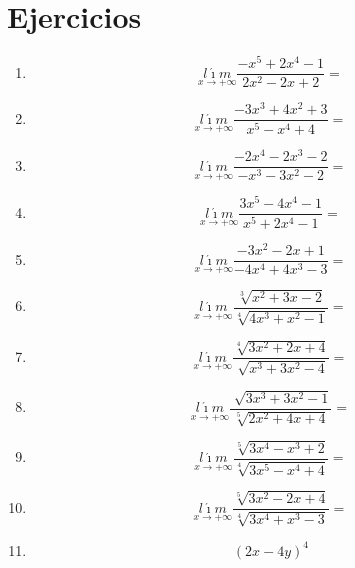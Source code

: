 \documentclass[oneside,spanish,letter]{article}
\begin{document}
\section{Ejercicios}
\begin{enumerate}
 \item $$\underset{x\rightarrow +\infty}{l\acute{\imath}m} \frac{-x^5+2x^4-1}{2x^2-2x+2}=$$
 \item $$\underset{x\rightarrow +\infty}{l\acute{\imath}m} \frac{-3x^3+4x^2+3}{x^5-x^4+4}=$$
 \item $$\underset{x\rightarrow +\infty}{l\acute{\imath}m} \frac{-2x^4-2x^3-2}{-x^3-3x^2-2}=$$
 \item $$\underset{x\rightarrow +\infty}{l\acute{\imath}m} \frac{3x^5-4x^4-1}{x^5+2x^4-1}=$$
 \item $$\underset{x\rightarrow +\infty}{l\acute{\imath}m} \frac{-3x^2-2x+1}{-4x^4+4x^3-3}=$$
 \item $$\underset{x\rightarrow +\infty}{l\acute{\imath}m} \frac{\sqrt[3]{x^2+3x-2}}{\sqrt[4]{4x^3+x^2-1}}=$$
 \item $$\underset{x\rightarrow +\infty}{l\acute{\imath}m} \frac{\sqrt[4]{3x^2+2x+4}}{\sqrt[]{x^3+3x^2-4}}=$$
 \item $$\underset{x\rightarrow +\infty}{l\acute{\imath}m} \frac{\sqrt[]{3x^3+3x^2-1}}{\sqrt[5]{2x^2+4x+4}}=$$
 \item $$\underset{x\rightarrow +\infty}{l\acute{\imath}m} \frac{\sqrt[5]{3x^4-x^3+2}}{\sqrt[4]{3x^5-x^4+4}}=$$
 \item $$\underset{x\rightarrow +\infty}{l\acute{\imath}m} \frac{\sqrt[5]{3x^2-2x+4}}{\sqrt[4]{3x^4+x^3-3}}=$$
\item $$(2x-4y)^4$$
 \end{enumerate}
  \newpage
\end{document}
